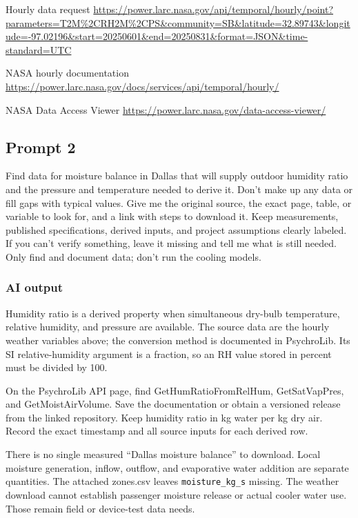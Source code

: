 Hourly data request  \url{https://power.larc.nasa.gov/api/temporal/hourly/point?parameters=T2M%2CRH2M%2CPS&community=SB&latitude=32.89743&longitude=-97.02196&start=20250601&end=20250831&format=JSON&time-standard=UTC}

NASA hourly documentation  \url{https://power.larc.nasa.gov/docs/services/api/temporal/hourly/}

NASA Data Access Viewer  \url{https://power.larc.nasa.gov/data-access-viewer/}

\subsection*{Prompt 2}
Find data for moisture balance in Dallas that will supply outdoor humidity ratio and the pressure and temperature needed to derive it. Don’t make up any data or fill gaps with typical values. Give me the original source, the exact page, table, or variable to look for, and a link with steps to download it. Keep measurements, published specifications, derived inputs, and project assumptions clearly labeled. If you can’t verify something, leave it missing and tell me what is still needed. Only find and document data; don’t run the cooling models.

\subsubsection*{AI output}
Humidity ratio is a derived property when simultaneous dry-bulb temperature, relative humidity, and pressure are available. The source data are the hourly weather variables above; the conversion method is documented in PsychroLib. Its SI relative-humidity argument is a fraction, so an RH value stored in percent must be divided by 100.

On the PsychroLib API page, find GetHumRatioFromRelHum, GetSatVapPres, and GetMoistAirVolume. Save the documentation or obtain a versioned release from the linked repository. Keep humidity ratio in kg water per kg dry air. Record the exact timestamp and all source inputs for each derived row.

There is no single measured “Dallas moisture balance” to download. Local moisture generation, inflow, outflow, and evaporative water addition are separate quantities. The attached zones.csv leaves \nolinkurl{moisture_kg_s} missing. The weather download cannot establish passenger moisture release or actual cooler water use. Those remain field or device-test data needs.

